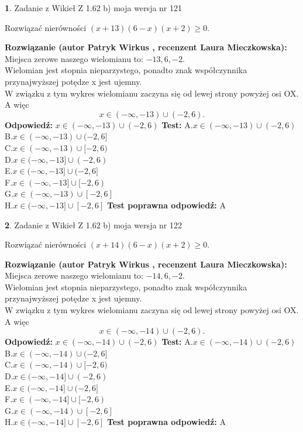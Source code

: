 \documentclass[12pt, a4paper]{article}
\theoremstyle{definition} %
\newtheorem{zad}{}
\newcommand{\zadStart}[1]{\begin{zad}#1\newline}
\newcommand{\zadStop}{\end{zad}}
\newcommand{\rozwStart}[2]{\noindent \textbf{Rozwiązanie (autor #1 , recenzent #2): }\newline}
\newcommand{\rozwStop}{\newline}
\newcommand{\odpStart}{\noindent \textbf{Odpowiedź:}\newline}
\newcommand{\odpStop}{\newline}
\newcommand{\testStart}{\noindent \textbf{Test:}\newline}
\newcommand{\testStop}{\newline}
\newcommand{\kluczStart}{\noindent \textbf{Test poprawna odpowiedź:}\newline}
\newcommand{\kluczStop}{\newline}
\begin{document}
\zadStart{Zadanie z Wikieł Z 1.62 b) moja wersja nr 121}

Rozwiązać nierówności $(x+13)(6-x)(x+2)\ge0$.
\zadStop
\rozwStart{Patryk Wirkus}{Laura Mieczkowska}
Miejsca zerowe naszego wielomianu to: $-13, 6, -2$.\\
Wielomian jest stopnia nieparzystego, ponadto znak współczynnika przy\linebreak najwyższej potędze x jest ujemny.\\ W związku z tym wykres wielomianu zaczyna się od lewej strony powyżej osi OX. A więc $$x \in (-\infty,-13) \cup (-2,6).$$
\rozwStop
\odpStart
$x \in (-\infty,-13) \cup (-2,6)$
\odpStop
\testStart
A.$x \in (-\infty,-13) \cup (-2,6)$\\
B.$x \in (-\infty,-13) \cup (-2,6]$\\
C.$x \in (-\infty,-13) \cup [-2,6)$\\
D.$x \in (-\infty,-13] \cup (-2,6)$\\
E.$x \in (-\infty,-13] \cup (-2,6]$\\
F.$x \in (-\infty,-13] \cup [-2,6)$\\
G.$x \in (-\infty,-13) \cup [-2,6]$\\
H.$x \in (-\infty,-13] \cup [-2,6]$
\testStop
\kluczStart
A
\kluczStop



\zadStart{Zadanie z Wikieł Z 1.62 b) moja wersja nr 122}

Rozwiązać nierówności $(x+14)(6-x)(x+2)\ge0$.
\zadStop
\rozwStart{Patryk Wirkus}{Laura Mieczkowska}
Miejsca zerowe naszego wielomianu to: $-14, 6, -2$.\\
Wielomian jest stopnia nieparzystego, ponadto znak współczynnika przy\linebreak najwyższej potędze x jest ujemny.\\ W związku z tym wykres wielomianu zaczyna się od lewej strony powyżej osi OX. A więc $$x \in (-\infty,-14) \cup (-2,6).$$
\rozwStop
\odpStart
$x \in (-\infty,-14) \cup (-2,6)$
\odpStop
\testStart
A.$x \in (-\infty,-14) \cup (-2,6)$\\
B.$x \in (-\infty,-14) \cup (-2,6]$\\
C.$x \in (-\infty,-14) \cup [-2,6)$\\
D.$x \in (-\infty,-14] \cup (-2,6)$\\
E.$x \in (-\infty,-14] \cup (-2,6]$\\
F.$x \in (-\infty,-14] \cup [-2,6)$\\
G.$x \in (-\infty,-14) \cup [-2,6]$\\
H.$x \in (-\infty,-14] \cup [-2,6]$
\testStop
\kluczStart
A
\kluczStop
\end{document}
